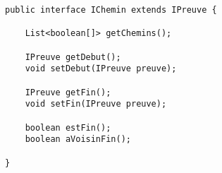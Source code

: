 \documentclass[dvipsnames]{report}
\begin{document}
\begin{lstlisting}[caption={Interface \psverb+IChemin+}, label={lst:IChemin}]
public interface IChemin extends IPreuve {

	List<boolean[]> getChemins();

	IPreuve getDebut();
	void setDebut(IPreuve preuve);

	IPreuve getFin();
	void setFin(IPreuve preuve);

	boolean estFin();
	boolean aVoisinFin();

}
\end{lstlisting}
\end{document}
